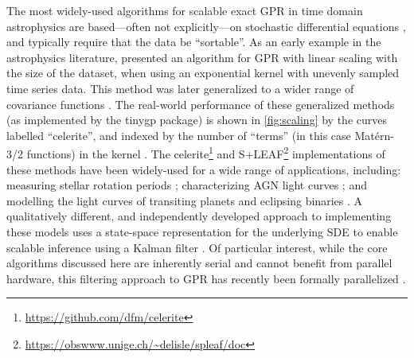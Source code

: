 \documentclass[letterpaper]{ar-1col}
\newcommand{\project}[1]{\textsf{#1}}
\begin{document}
The most widely-used algorithms for scalable exact GPR in time domain astrophysics are based---often not explicitly---on stochastic differential equations \citep[SDEs;][]{Sarkka:2019}, and typically require that the data be ``sortable''.
As an early example in the astrophysics literature, \citet{pr95} presented an algorithm for GPR with linear scaling with the size of the dataset, when using an exponential kernel with unevenly sampled time series data.
This method was later generalized to a wider range of covariance functions \citep{ambikasaran2015generalized, celerite, 2020AJ....160..240G, 2020A&A...638A..95D, 2022A&A...659A.182D}.
The real-world performance of these generalized methods (as implemented by the \project{tinygp} package) is shown in \autoref{fig:scaling} by the curves labelled ``celerite'', and indexed by the number of ``terms'' (in this case Mat\'ern-3/2 functions) in the kernel \citep[see][for a more detailed discussion]{celerite}.
The \project{celerite}\footnote{\url{https://github.com/dfm/celerite}} and \project{S+LEAF}\footnote{\url{https://obswww.unige.ch/~delisle/spleaf/doc}} implementations of these methods have been widely-used for a wide range of applications, including: measuring stellar rotation periods \citep[e.g.,][]{2020MNRAS.492.1008G, 2021ApJ...913...70G, 2022AJ....164..115N}; characterizing AGN light curves \citep[e.g.,][]{2022ApJ...936..132Y}; and modelling the light curves of transiting planets \citep[e.g.,][]{2019AJ....158...32K} and eclipsing binaries \citep[e.g.,][]{2020ApJS..250...34C}.
A qualitatively different, and independently developed approach to implementing these models uses a state-space representation for the underlying SDE to enable scalable inference using a Kalman filter \citep{2014ApJ...788...33K,  2021RNAAS...5..107J, 2022arXiv220709327M}.
Of particular interest, while the core algorithms discussed here are inherently serial and cannot benefit from parallel hardware, this filtering approach to GPR has recently been formally parallelized \citep{sarkka2020temporal}.
\end{document}
